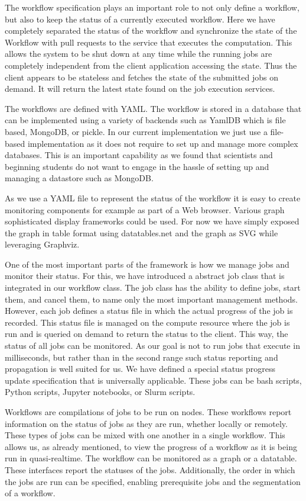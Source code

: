 The workflow specification plays an important role to not only define
a workflow, but also to keep the status of a currently executed
workflow. Here we have completely separated the status of the workflow
and synchronize the state of the Workflow with pull requests to the
service that executes the computation. This allows the system to be
shut down at any time while the running jobs are completely
independent from the client application accessing the state. Thus the
client appears to be stateless and fetches the state of the submitted
jobs on demand. It will return the latest state found on the job
execution services.

The workflows are defined with YAML. The workflow is stored in a
database that can be implemented using a variety of backends such as
YamlDB which is file based, MongoDB, or pickle. In our current
implementation we just use a file-based implementation as it does not
require to set up and manage more complex databases. This is an
important capability as we found that scientists and beginning
students do not want to engage in the hassle of setting up and
managing a datastore such as MongoDB.

As we use a YAML file to represent the status of the workflow it is
easy to create monitoring components for example as part of a Web
browser. Various graph sophisticated display frameworks could be
used. For now we have simply exposed the graph in table format using
datatables.net and the graph as SVG while leveraging Graphviz.

One of the most important parts of the framework is how we manage jobs
and monitor their status. For this, we have introduced a abstract job
class that is integrated in our workflow class. The job class has the
ability to define jobs, start them, and cancel them, to name only the
most important management methods. However, each job defines a status
file in which the actual progress of the job is recorded. This status
file is managed on the compute resource where the job is run and is
queried on demand to return the status to the client. This way, the
status of all jobs can be monitored. As our goal is not to run jobs
that execute in milliseconds, but rather than in the second range such
status reporting and propagation is well suited for us. We have
defined a special status progress update specification that is
universally applicable. These jobs can be bash scripts, Python scripts,
Jupyter notebooks, or Slurm scripts.

Workflows are compilations of jobs to be run on nodes. These workflows
report information on the status of jobs as they are run, whether
locally or remotely.  These types of jobs can be mixed
with one another in a single workflow. This allows us, as already mentioned, 
to view the progress of a workflow as it is being run in quasi-realtime.
The workflow can be monitored as a graph or a datatable. These interfaces
report the statuses of the jobs. Additionally, the order in which the jobs
are run can be specified, enabling prerequisite jobs and the segmentation of a
workflow.

